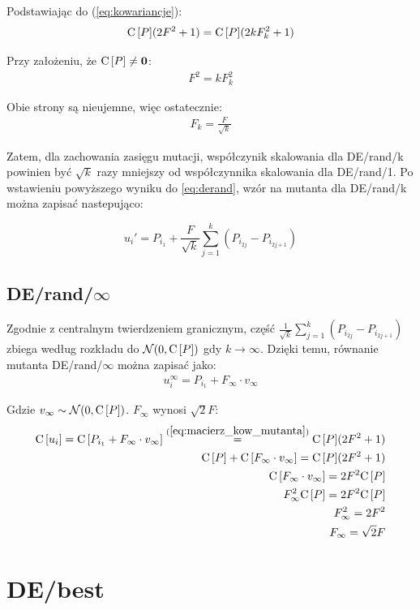 \documentclass[a4paper,onecolumn,oneside,12pt,wide,floatssmall]{mwrep}
\def\C{{\rm C}\,}
\theoremstyle{definition}
\theoremstyle{plain}%
\theoremstyle{remark}
\begin{document}
Podstawiając do (\ref{eq:kowariancje}):
\begin{align*}
\C[P](2F^2 + 1) = \C[P](2kF_k^2 + 1)
\end{align*}

Przy założeniu, że $\C[P] \neq \textbf{0}$:
\begin{align*}
F^2 = kF_k^2
\end{align*}

Obie strony są nieujemne, więc ostatecznie:
\begin{align*}
F_k = \frac{F}{\sqrt{k}}
\end{align*}

Zatem, dla zachowania zasięgu mutacji, współczynik skalowania dla DE/rand/k powinien być  
$\sqrt{k}$ razy mniejszy od współczynnika skalowania dla DE/rand/1. Po wstawieniu powyższego wyniku
do \ref{eq:derand}, wzór na mutanta dla DE/rand/k można zapisać nastepująco:

$$ u_i' = P_{i_1} + \frac{F}{\sqrt{k}}\sum\limits_{j=1}^k (P_{i_{2j}} - P_{i_{2j+1}}) $$

\subsection{DE/rand/$\infty$}
\label{sub:de_rand_inf}

Zgodnie z centralnym twierdzeniem granicznym, część $\frac{1}{{\sqrt{k}}}\sum\limits_{j=1}^k (P_{i_{2j}} - P_{i_{2j+1}})$ 
zbiega według rozkładu do $\mathcal{N}(0, \C[P])$ gdy $k \to \infty$. 
Dzięki temu, równanie mutanta DE/rand/$\infty$ można zapisać jako:
\begin{align*}
u_i^\infty = P_{i_1} + F_\infty \cdot v_\infty
\end{align*}

Gdzie $v_\infty \sim \mathcal{N}(0, \C[P])$. $F_\infty$ wynosi $\sqrt{2}F$:
\begin{align*}
\C[u_i] = \C[P_{i_1} + F_\infty \cdot v_\infty] \overset{(\ref{eq:macierz_kow_mutanta})}{=} \C[P](2F^2 + 1) \\
\C[P] + \C[F_\infty \cdot v_\infty] = \C[P](2F^2 + 1) \\
\C[F_\infty \cdot v_\infty] = 2F^2\C[P] \\
F_\infty^2 \C[P] = 2F^2\C[P] \\
F_\infty^2 = 2F^2 \\
F_\infty = \sqrt{2}F
\end{align*}

\section{DE/best}
\end{document}

